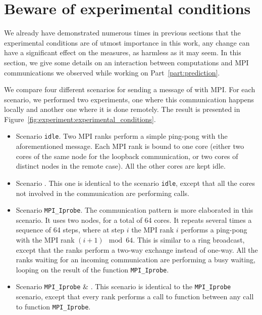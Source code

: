     \section{Beware of experimental conditions}%
    \label{sec:beware_of_experimental_conditions}
        We already have demonstrated numerous times in previous sections that the experimental conditions are of utmost
        importance in this work, any change can have a significant effect on the measures, as harmless as it may seem.
        In this section, we give some details on an interaction between computations and MPI communications we observed
        while working on Part~\ref{part:prediction}.

        We compare four different scenarios for sending a message of  with MPI. For each scenario,
        we performed two experiments, one where this communication happens locally and another one where it is done
        remotely. The result is presented in Figure~\ref{fig:experiment:experimental_conditions}.
        \begin{itemize}
            \item Scenario \texttt{idle}. Two MPI ranks perform a simple ping-pong with the aforementioned message. Each
                MPI rank is bound to one core (either two cores of the same node for the loopback communication, or two
                cores of distinct nodes in the remote case). All the other cores are kept idle.
            \item Scenario \dgemm. This one is identical to the scenario \texttt{idle}, except that all the cores not
                involved in the communication are performing \dgemm calls.
            \item Scenario \texttt{MPI\_Iprobe}. The communication pattern is more elaborated in this scenario. It uses
                two nodes, for a total of 64 cores. It repeats several times a sequence of 64 steps, where at step \(i\)
                the MPI rank \(i\) performs a ping-pong with the MPI rank \((i+1)\mod64\). This is similar to a ring
                broadcast, except that the ranks perform a two-way exchange instead of one-way. All the ranks waiting
                for an incoming communication are performing a busy waiting, looping on the result of the function
                \texttt{MPI\_Iprobe}.
            \item Scenario \texttt{MPI\_Iprobe} \& \dgemm. This scenario is identical to the \texttt{MPI\_Iprobe}
                scenario, except that every rank performs a call to function \dgemm between any call to function
                \texttt{MPI\_Iprobe}.
        \end{itemize}

